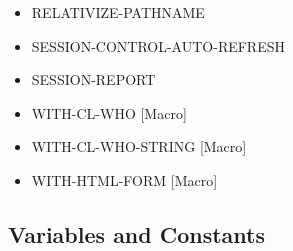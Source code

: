 \documentclass [11pt]{book}
\begin{document}
\begin{itemize}
\item {}RELATIVIZE-PATHNAME





\item {}SESSION-CONTROL-AUTO-REFRESH





\item {}SESSION-REPORT





\item {}WITH-CL-WHO [Macro]





\item {}WITH-CL-WHO-STRING [Macro]





\item {}WITH-HTML-FORM [Macro]





\end{itemize}



\subsection{Variables and Constants}

\label{subsec:variablesandconstants}
\end{document}
